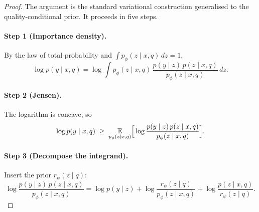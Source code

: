 \begin{proof}
The argument is the standard variational construction generalised to the quality-conditional
prior. It proceeds in five steps.

\paragraph{Step 1 (Importance density).}
By the law of total probability and $\int p_\phi(z\mid x,q)\,dz=1$,
\begin{equation}
\log p(y\mid x,q) = \log\!\int p_\phi(z\mid x,q)\,
\frac{p(y\mid z)\,p(z\mid x,q)}{p_\phi(z\mid x,q)}\,dz.
\label{eq:a1-p1-1}
\end{equation}

\paragraph{Step 2 (Jensen).}
The logarithm is concave, so
\begin{equation}
\log p(y\mid x,q) \;\geq\;
\operatorname*{\mathbb{E}}_{p_\phi(z\mid x,q)}\!\Big[\log\frac{p(y\mid z)\,p(z\mid x,q)}{p_\phi(z\mid x,q)}\Big].
\label{eq:a1-p1-2}
\end{equation}

\paragraph{Step 3 (Decompose the integrand).}
Insert the prior $r_\psi(z\mid q)$:
\begin{equation}
\log\frac{p(y\mid z)\,p(z\mid x,q)}{p_\phi(z\mid x,q)}
= \log p(y\mid z) + \log\frac{r_\psi(z\mid q)}{p_\phi(z\mid x,q)}
+ \log\frac{p(z\mid x,q)}{r_\psi(z\mid q)}.
\label{eq:a1-p1-3}
\end{equation}


\end{proof}
